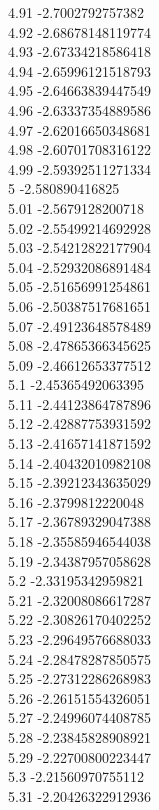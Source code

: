 {4.91	-2.7002792757382\\
4.92	-2.68678148119774\\
4.93	-2.67334218586418\\
4.94	-2.65996121518793\\
4.95	-2.64663839447549\\
4.96	-2.63337354889586\\
4.97	-2.62016650348681\\
4.98	-2.60701708316122\\
4.99	-2.59392511271334\\
5	-2.580890416825\\
5.01	-2.5679128200718\\
5.02	-2.55499214692928\\
5.03	-2.54212822177904\\
5.04	-2.52932086891484\\
5.05	-2.51656991254861\\
5.06	-2.50387517681651\\
5.07	-2.49123648578489\\
5.08	-2.47865366345625\\
5.09	-2.46612653377512\\
5.1	-2.45365492063395\\
5.11	-2.44123864787896\\
5.12	-2.42887753931592\\
5.13	-2.41657141871592\\
5.14	-2.40432010982108\\
5.15	-2.39212343635029\\
5.16	-2.3799812220048\\
5.17	-2.36789329047388\\
5.18	-2.35585946544038\\
5.19	-2.34387957058628\\
5.2	-2.33195342959821\\
5.21	-2.32008086617287\\
5.22	-2.30826170402252\\
5.23	-2.29649576688033\\
5.24	-2.28478287850575\\
5.25	-2.27312286268983\\
5.26	-2.26151554326051\\
5.27	-2.24996074408785\\
5.28	-2.23845828908921\\
5.29	-2.22700800223447\\
5.3	-2.21560970755112\\
5.31	-2.20426322912936\\
}
